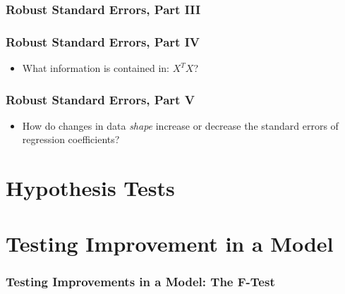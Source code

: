 \documentclass[12pt, block=fill]{beamer}
\begin{document}
\begin{frame}
  \frametitle{Robust Standard Errors, Part III}

\end{frame}

\begin{frame}[t]
  \frametitle{Robust Standard Errors, Part IV}

  \begin{itemize}
    \item What information is contained in: $X^{T}X$?
  \end{itemize}


\end{frame}

\begin{frame}[t]
  \frametitle{Robust Standard Errors, Part V}

  \begin{itemize}
      \item How do changes in data \textit{shape} increase or decrease the standard errors of regression coefficients?
  \end{itemize}



\end{frame}

\section{Hypothesis Tests}

\section{Testing Improvement in a Model}

\begin{frame}
  \frametitle{Testing Improvements in a Model: The F-Test}
  
\end{frame} 
\end{document}
